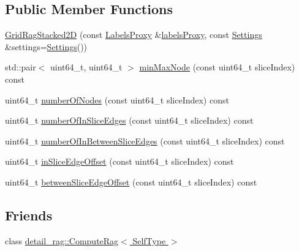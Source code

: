 \subsection*{Public Member Functions}
\begin{DoxyCompactItemize}
\item 
\hyperlink{classnifty_1_1graph_1_1GridRagStacked2D_ad6b23b6d315c94ce484b220ef34ba1ca}{Grid\+Rag\+Stacked2\+D} (const \hyperlink{classnifty_1_1graph_1_1GridRagStacked2D_a09b44c819b97274a1025dc68cb6b3dc9}{Labels\+Proxy} \&\hyperlink{classnifty_1_1graph_1_1GridRag_a9a9b20451bd5ea8ce3ee11af4018c995}{labels\+Proxy}, const \hyperlink{classnifty_1_1graph_1_1GridRagStacked2D_a7b0a5b8d3cb7ac39213e5306fd42aa27}{Settings} \&settings=\hyperlink{classnifty_1_1graph_1_1GridRagStacked2D_a7b0a5b8d3cb7ac39213e5306fd42aa27}{Settings}())
\item 
std\+::pair$<$ uint64\+\_\+t, uint64\+\_\+t $>$ \hyperlink{classnifty_1_1graph_1_1GridRagStacked2D_ae7abe343f431f1a1ca953f3f9dd5e659}{min\+Max\+Node} (const uint64\+\_\+t slice\+Index) const 
\item 
uint64\+\_\+t \hyperlink{classnifty_1_1graph_1_1GridRagStacked2D_aa87c188ce0a2d246e1461bac64cf3a8a}{number\+Of\+Nodes} (const uint64\+\_\+t slice\+Index) const 
\item 
uint64\+\_\+t \hyperlink{classnifty_1_1graph_1_1GridRagStacked2D_a646bcd62254f454d3ac2e584b1b07428}{number\+Of\+In\+Slice\+Edges} (const uint64\+\_\+t slice\+Index) const 
\item 
uint64\+\_\+t \hyperlink{classnifty_1_1graph_1_1GridRagStacked2D_acfdac0e16539e96d36fdc1615e3e4ee1}{number\+Of\+In\+Between\+Slice\+Edges} (const uint64\+\_\+t slice\+Index) const 
\item 
uint64\+\_\+t \hyperlink{classnifty_1_1graph_1_1GridRagStacked2D_a111282918d5ef7ef97e4328d575b7089}{in\+Slice\+Edge\+Offset} (const uint64\+\_\+t slice\+Index) const 
\item 
uint64\+\_\+t \hyperlink{classnifty_1_1graph_1_1GridRagStacked2D_aa55f6424ed3ba64fe5cfc42b69876f8e}{between\+Slice\+Edge\+Offset} (const uint64\+\_\+t slice\+Index) const 
\end{DoxyCompactItemize}
\subsection*{Friends}
\begin{DoxyCompactItemize}
\item 
class \hyperlink{classnifty_1_1graph_1_1GridRagStacked2D_abafcbd3543961eb6e4ee794aa6a62d66}{detail\+\_\+rag\+::\+Compute\+Rag$<$ Self\+Type $>$}
\end{DoxyCompactItemize}

